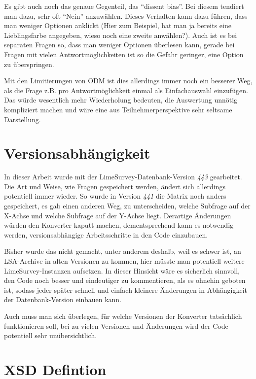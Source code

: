 Es gibt auch noch das genaue Gegenteil, das \enquote{dissent bias}. Bei diesem tendiert man dazu, sehr oft \enquote{Nein} anzuwählen.
Dieses Verhalten kann dazu führen, dass man weniger Optionen anklickt (Hier zum Beispiel, hat man ja bereits eine Lieblingsfarbe angegeben, wieso noch eine zweite anwählen?).
Auch ist es bei separaten Fragen so, dass man weniger Optionen überlesen kann, gerade bei Fragen mit vielen Antwortmöglichkeiten ist so die Gefahr geringer, eine Option zu überspringen.

Mit den Limitierungen von ODM ist dies allerdings immer noch ein besserer Weg, als die Frage z.B. pro Antwortmöglichkeit einmal als Einfachauswahl einzufügen.
Das würde wesentlich mehr Wiederholung bedeuten, die Auswertung unnötig kompliziert machen und wäre eine aus Teilnehmerperspektive sehr seltsame Darstellung.

\section{Versionsabhängigkeit}
\label{d:version}

In dieser Arbeit wurde mit der LimeSurvey-Datenbank-Version \textit{443} gearbeitet.
Die Art und Weise, wie Fragen gespeichert werden, ändert sich allerdings potentiell immer wieder.
So wurde in Version \textit{441} die Matrix noch anders gespeichert, es gab einen anderen Weg, zu unterscheiden, welche Subfrage auf der X-Achse und welche Subfrage auf der Y-Achse liegt.
Derartige Änderungen würden den Konverter kaputt machen, dementsprechend kann es notwendig werden, versionsabhängige Arbeitsschritte in den Code einzubauen.

Bisher wurde das nicht gemacht, unter anderem deshalb, weil es schwer ist, an LSA-Archive in alten Versionen zu kommen, hier müsste man potentiell weitere LimeSurvey-Instanzen aufsetzen.
In dieser Hinsicht wäre es sicherlich sinnvoll, den Code noch besser und eindeutiger zu kommentieren, als es ohnehin geboten ist, sodass jeder später schnell und einfach kleinere Änderungen in Abhängigkeit der Datenbank-Version einbauen kann.

Auch muss man sich überlegen, für welche Versionen der Konverter tatsächlich funktionieren soll, bei zu vielen Versionen und Änderungen wird der Code potentiell sehr unübersichtlich.

\section{XSD Defintion}

